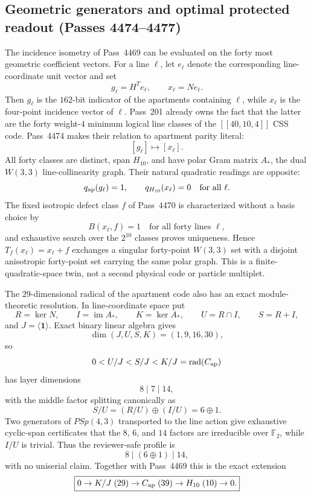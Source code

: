 \subsection{Geometric generators and optimal protected readout (Passes 4474--4477)}
\label{sec:pass4474-apartment-h10-continuation}

The incidence isometry of Pass~4469 can be evaluated on the forty most
geometric coefficient vectors.  For a line $\ell$, let $e_\ell$ denote the
corresponding line-coordinate unit vector and set
\[
 g_\ell=H^Te_\ell,
 \qquad
 x_\ell=Ne_\ell.
\]
Then $g_\ell$ is the $162$-bit indicator of the apartments containing
$\ell$, while $x_\ell$ is the four-point incidence vector of $\ell$.
Pass~201 already owns the fact that the latter are the forty weight-$4$
minimum logical line classes of the $[[40,10,4]]$ CSS code.  Pass~4474
makes their relation to apartment parity literal:
\[
 \boxed{[g_\ell]\longmapsto[x_\ell].}
\]
All forty classes are distinct, span $H_{10}$, and have polar Gram matrix
$A_*$, the dual $W(3,3)$ line-collinearity graph.  Their natural quadratic
readings are opposite:
\[
 q_{\rm ap}(g_\ell)=1,
 \qquad
 q_{H_{10}}(x_\ell)=0
 \quad\text{for all }\ell.
\]
The fixed isotropic defect class $f$ of Pass~4470 is characterized without
a basis choice by
\[
 \boxed{B(x_\ell,f)=1\quad\text{for all forty lines }\ell,}
\]
and exhaustive search over the $2^{10}$ classes proves uniqueness.  Hence
$T_f(x_\ell)=x_\ell+f$ exchanges a singular forty-point $W(3,3)$ set with
a disjoint anisotropic forty-point set carrying the same polar graph.  This
is a finite-quadratic-space twin, not a second physical code or particle
multiplet.

The $29$-dimensional radical of the apartment code also has an exact
module-theoretic resolution.  In line-coordinate space put
\[
 R=\ker N,\qquad I=\operatorname{im}A_*,\qquad
 K=\ker A_*,\qquad U=R\cap I,\qquad S=R+I,
\]
and $J=\langle\mathbf1\rangle$.  Exact binary linear algebra gives
\[
 \dim(J,U,S,K)=(1,9,16,30),
\]
so
\[
 0<U/J<S/J<K/J=\operatorname{rad}(C_{\rm ap})
\]
has layer dimensions
\[
 \boxed{8\mid7\mid14,}
\]
with the middle factor splitting canonically as
\[
 S/U=(R/U)\oplus(I/U)=6\oplus1.
\]
Two generators of $PSp(4,3)$ transported to the line action give exhaustive
cyclic-span certificates that the $8$, $6$, and $14$ factors are irreducible
over $\mathbb F_2$, while $I/U$ is trivial.  Thus the reviewer-safe profile is
\[
 \boxed{8\mid(6\oplus1)\mid14,}
\]
with no uniserial claim.  Together with Pass~4469 this is the exact extension
\[
 \boxed{0\to K/J\;(29)\to C_{\rm ap}\;(39)\to H_{10}\;(10)\to0.}
\]

